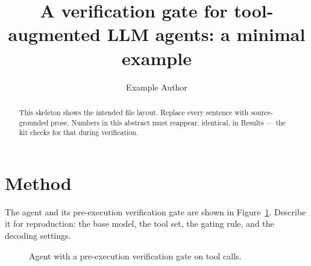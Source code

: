 \documentclass[11pt]{article}
\title{A verification gate for tool-augmented LLM agents: a minimal example}
\author{Example Author}
\begin{document}
\maketitle

\begin{abstract}
This skeleton shows the intended file layout. Replace every sentence with
source-grounded prose. Numbers in this abstract must reappear, identical, in
Results --- the kit checks for that during verification.
\end{abstract}



\section{Method}
The agent and its pre-execution verification gate are shown in
Figure~\ref{fig:arch}. Describe it for reproduction: the base model, the tool
set, the gating rule, and the decoding settings.

\begin{figure}[t]
  \centering
  \caption{Agent with a pre-execution verification gate on tool calls.}
  \label{fig:arch}
\end{figure}



\end{document}
